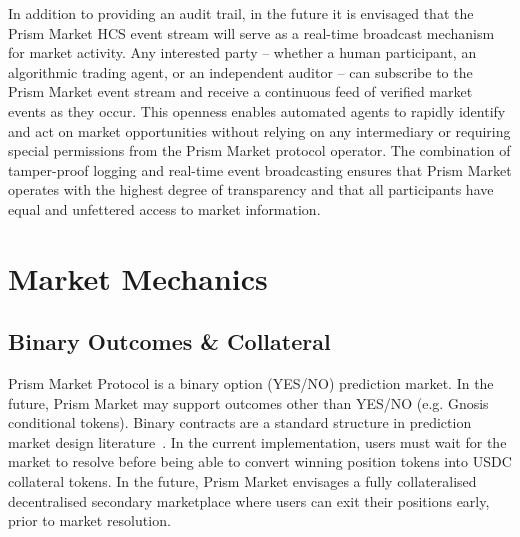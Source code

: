 \documentclass[11pt,a4paper]{article}
\begin{document}
In addition to providing an audit trail, in the future it is envisaged that the Prism Market HCS event stream will serve as a real-time broadcast mechanism for market activity. Any interested party -- whether a human participant, an algorithmic trading agent, or an independent auditor -- can subscribe to the Prism Market event stream and receive a continuous feed of verified market events as they occur. This openness enables automated agents to rapidly identify and act on market opportunities without relying on any intermediary or requiring special permissions from the Prism Market protocol operator. The combination of tamper-proof logging and real-time event broadcasting ensures that Prism Market operates with the highest degree of transparency and that all participants have equal and unfettered access to market information.

\section{Market Mechanics}

\subsection{Binary Outcomes \& Collateral}

Prism Market Protocol is a binary option (YES/NO) prediction market. In the future, Prism Market may support outcomes other than YES/NO (e.g. Gnosis conditional tokens). Binary contracts are a standard structure in prediction market design literature~\cite{hanson2003}. In the current implementation, users must wait for the market to resolve before being able to convert winning position tokens into USDC collateral tokens. In the future, Prism Market envisages a fully collateralised decentralised secondary marketplace where users can exit their positions early, prior to market resolution.


\end{document}
